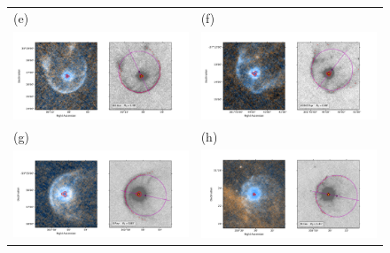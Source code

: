 \documentclass[useAMS, usenatbib, a4paper]{mnras}
\begin{document}
\begin{figure}
\begin{tabular}{ll}
    (e) & (f) \\
    \includegraphics[trim=10 0 65 20, clip]{figs/uuaur-imageplot}
    & \includegraphics[trim=10 0 65 20, clip]{figs/v1943sgr-imageplot}\\
    (g) & (h) \\
    \includegraphics[trim=10 0 65 20, clip]{figs/xpav-imageplot}
    & \includegraphics[trim=10 0 65 20, clip]{figs/rcas-imageplot}

\end{tabular}
\end{figure}
\end{document}
